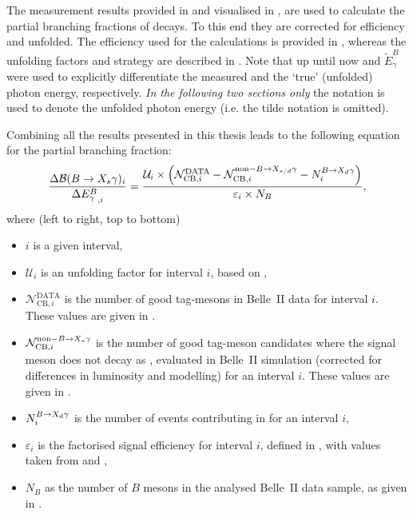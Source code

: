 The measurement results provided in  and visualised in ,
are used to calculate the partial branching fractions of \BtoXsgamma decays.
To this end they are corrected for efficiency and unfolded.
The efficiency used for the calculations is provided in , 
whereas the unfolding factors and strategy are described in .
Note that up until now \EB and $\tilde{E}_{\gamma}^B$ were used to explicitly differentiate
the measured and the `true' (unfolded) photon energy, respectively.
\textit{In the following two sections only} the \EB notation is used to denote the unfolded photon energy (i.e. the tilde notation is omitted).

Combining all the results presented in this thesis leads to the following equation for the partial branching fraction:
\begin{equation}\label{eq:branching_fraction}
    \frac{\Delta\mathcal{B}(\BtoXsgamma)_i}{\Delta {E^B_{\g}}_{,i}} = \frac{\mathcal{U}_i\times\left(\mathcal{N}^{\mathrm{DATA}}_{\mathrm{CB},i} - 
                                                                              \mathcal{N}^{\mathrm{non-}\BtoXsdgamma}_{\mathrm{CB},i} - 
                                                                              N_i^{\BtoXdgamma}\right)}
                                                         {\varepsilon_i \times N_B},
\end{equation}
where (left to right, top to bottom)
\begin{itemize}
    \item $i$ is a given \EB interval,
    \item $\mathcal{U}_i$ is an unfolding factor for interval $i$, based on ,
    \item $\mathcal{N}^{\mathrm{DATA}}_{\mathrm{CB},i}$ is the number of good tag-\B mesons in Belle~II data for interval $i$.
    These values are given in .
    \item $\mathcal{N}^{\mathrm{non-}\BtoXsgamma}_{\mathrm{CB},i}$ is the number of good tag-\B meson candidates where the signal \B meson does not decay as \BtoXsdgamma, evaluated in Belle~II simulation (corrected for differences in luminosity and modelling) for an interval $i$.
    These values are given in .
    \item $N_i^{\BtoXdgamma}$ is the number of \BtoXdgamma events contributing in for an interval $i$,
    \item $\varepsilon_i$ is the factorised signal efficiency for interval $i$, defined in , 
    with values taken from  and ,
    \item $N_B$ as the number of $B$ mesons in the analysed Belle~II data sample, as given in .
\end{itemize}

